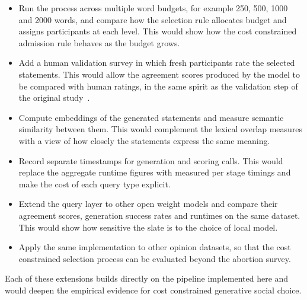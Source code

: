 \documentclass[letterpaper,11pt]{article}
\theoremstyle{plain}
\theoremstyle{definition}
\begin{document}
\begin{itemize}
\item Run the process across multiple word budgets, for example 250, 500, 1000 and 2000 words, and compare how the selection rule allocates budget and assigns participants at each level. This would show how the cost constrained admission rule behaves as the budget grows. \smallskip

\item Add a human validation survey in which fresh participants rate the selected statements. This would allow the agreement scores produced by the model to be compared with human ratings, in the same spirit as the validation step of the original study~\citep{fish2026gsc}. \smallskip

\item Compute embeddings of the generated statements and measure semantic similarity between them. This would complement the lexical overlap measures with a view of how closely the statements express the same meaning. \smallskip

\item Record separate timestamps for generation and scoring calls. This would replace the aggregate runtime figures with measured per stage timings and make the cost of each query type explicit. \smallskip

\item Extend the query layer to other open weight models and compare their agreement scores, generation success rates and runtimes on the same dataset. This would show how sensitive the slate is to the choice of local model. \smallskip

\item Apply the same implementation to other opinion datasets, so that the cost constrained selection process can be evaluated beyond the abortion survey.
\end{itemize}

Each of these extensions builds directly on the pipeline implemented here and would deepen the empirical evidence for cost constrained generative social choice.
\end{document}
